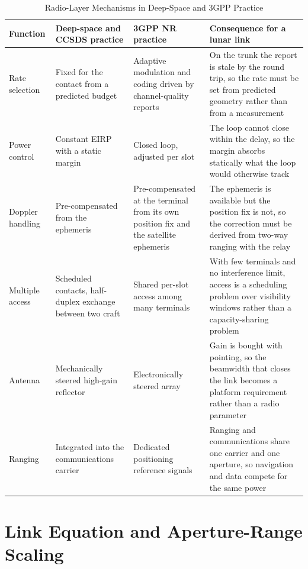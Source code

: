 \documentclass[11pt,a4paper]{article}
\begin{document}
\begin{table}[!t]
\caption{Radio-Layer Mechanisms in Deep-Space and 3GPP Practice}
\label{tab:rosetta_radio}
\centering
\footnotesize
\begin{tabularx}{\textwidth}{@{}>{\raggedright\arraybackslash}p{2.2cm}>{\raggedright\arraybackslash}p{3.9cm}>{\raggedright\arraybackslash}p{3.5cm}>{\raggedright\arraybackslash}X@{}}
\toprule
Function & Deep-space and CCSDS practice & 3GPP NR practice & Consequence for a lunar link \\
\midrule
Rate selection & Fixed for the contact from a predicted budget & Adaptive modulation and coding driven by channel-quality reports & On the trunk the report is stale by the round trip, so the rate must be set from predicted geometry rather than from a measurement \\
Power control & Constant EIRP with a static margin & Closed loop, adjusted per slot~\cite{3gpp_tr_38821} & The loop cannot close within the delay, so the margin absorbs statically what the loop would otherwise track \\
Doppler handling & Pre-compensated from the ephemeris & Pre-compensated at the terminal from its own position fix and the satellite ephemeris & The ephemeris is available but the position fix is not, so the correction must be derived from two-way ranging with the relay \\
Multiple access & Scheduled contacts, half-duplex exchange between two craft~\cite{ccsds_prox1} & Shared per-slot access among many terminals & With few terminals and no interference limit, access is a scheduling problem over visibility windows rather than a capacity-sharing problem \\
Antenna & Mechanically steered high-gain reflector & Electronically steered array & Gain is bought with pointing, so the beamwidth that closes the link becomes a platform requirement rather than a radio parameter \\
Ranging & Integrated into the communications carrier & Dedicated positioning reference signals~\cite{prs_ntn_plans2023} & Ranging and communications share one carrier and one aperture, so navigation and data compete for the same power \\
\bottomrule
\end{tabularx}
\end{table}


\section{Link Equation and Aperture-Range Scaling}
\label{sec:fundamentals}
\end{document}
